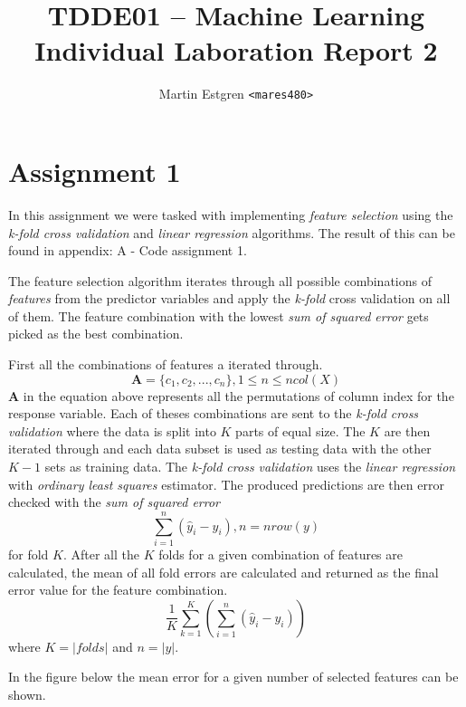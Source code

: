 \documentclass[a4paper,12pt]{article}
\title{TDDE01 -- Machine Learning \\
       Individual Laboration Report 2}
\author{Martin Estgren \texttt{<mares480>}}
\begin{document}
    \maketitle %
\section{Assignment 1}

In this assignment we were tasked with implementing \textit{feature selection} using the \textit{k-fold cross validation} and \textit{linear regression} algorithms. The result of this can be found in appendix: A - Code assignment 1. 

The feature selection algorithm iterates through all possible combinations of \textit{features} from the predictor variables and apply the \textit{k-fold} cross validation on all of them. The feature combination with the lowest \textit{sum of squared error} gets picked as the best combination. 

First all the combinations of features a iterated through.
\begin{equation}
  \mathbf{A} = \{c_1,c_2,...,c_n\}, 1 \le n \le ncol(X)
\end{equation} 
\( \mathbf{A} \) in the equation above represents all the permutations of column index for the response variable. Each of theses combinations are sent to the \textit{k-fold cross validation} where the data is split into  \( \mathit{K} \)  parts of equal size. The  \( \mathit{K} \) are then iterated through and each data subset is used as testing data with the other \( \mathit{K} -1 \) sets as training data. The \textit{k-fold cross validation} uses the \textit{linear regression} with \textit{ordinary least squares} estimator.  The produced predictions are then error checked with the \textit{sum of squared error} 
\begin{equation}
  \sum _{i = 1} ^{n} (\hat{y}_i - y_i), n = nrow(y)
\end{equation} 
for fold \( \mathit{K} \). After all the \( \mathit{K} \) folds for a given combination of features are calculated, the mean of all fold errors are calculated and returned as the final error value for the feature combination.
\begin{equation}
\frac{1}{\mathit{K}}\sum_{k = 1}^{\mathit{K}} ( \sum _{i = 1} ^{n} (\hat{y}_i - y_i))
\end{equation} 
where \( \mathit{K} = |folds|\) and \(n = |y|\).

In the figure below the mean error for a given number of selected features can be shown. 
\end{document}
